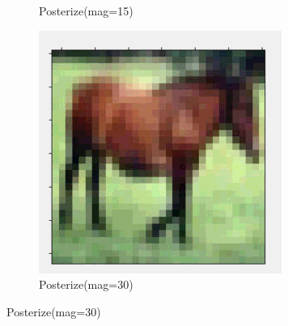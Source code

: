\documentclass[onecolumn]{ujarticle}   %
\begin{document}
\begin{figure}[h]
\begin{subfigure}{0.3\columnwidth}
        \caption{Posterize(mag=15)}
        \label{fig:Posterize_15}
      \end{subfigure}
      \begin{subfigure}{0.3\columnwidth}
        \centering
        \includegraphics[width=1.0\columnwidth]{transform_test/Posterize_30.png}
        \caption{Posterize(mag=30)}
        \label{fig:Posterize_30}
      \end{subfigure}



\end{figure}
\end{document}
